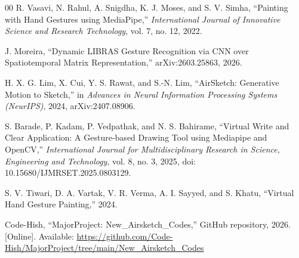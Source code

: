 \documentclass[conference]{IEEEtran}
\begin{document}
\begin{thebibliography}{00}
R. Vasavi, N. Rahul, A. Snigdha, K. J. Moses, and S. V. Simha,
``Painting with Hand Gestures using MediaPipe,''
\emph{International Journal of Innovative Science and Research Technology},
vol. 7, no. 12, 2022.

J. Moreira,
``Dynamic LIBRAS Gesture Recognition via CNN over Spatiotemporal Matrix Representation,''
arXiv:2603.25863, 2026.

H. X. G. Lim, X. Cui, Y. S. Rawat, and S.-N. Lim,
``AirSketch: Generative Motion to Sketch,''
in \emph{Advances in Neural Information Processing Systems (NeurIPS)}, 2024,
arXiv:2407.08906.

S. Barade, P. Kadam, P. Vedpathak, and N. S. Bahirame,
``Virtual Write and Clear Application: A Gesture-based Drawing Tool using Mediapipe and OpenCV,''
\emph{International Journal for Multidisciplinary Research in Science, Engineering and Technology},
vol. 8, no. 3, 2025,
doi: 10.15680/IJMRSET.2025.0803129.

S. V. Tiwari, D. A. Vartak, V. R. Verma, A. I. Sayyed, and S. Khatu,
``Virtual Hand Gesture Painting,''
2024.

Code-Hish, ``MajorProject: New\_Airsketch\_Codes,'' GitHub repository, 2026. [Online]. Available: \url{https://github.com/Code-Hish/MajorProject/tree/main/New_Airsketch_Codes}

\end{thebibliography}
\end{document}
